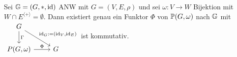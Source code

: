 \begin{bemerkung}
    Sei $\G = (G, \ast, \id)$ ANW mit $G=(V,E,\rho)$ und sei $\omega: V \to W$ Bijektion mit $W \cap E^{\langle + \rangle} = \emptyset$.
    Dann existiert genau ein Funktor $\Phi$ von $\P(G, \omega)$ nach $\G$ mit
    $\begin{tikzcd}
        G \dar{\Gamma} \drar{\id_G:=(\id_V, \id_E)}\\
        P(G,\omega) \rar{\Phi} & G
    \end{tikzcd}$ ist kommutativ.
\end{bemerkung}
